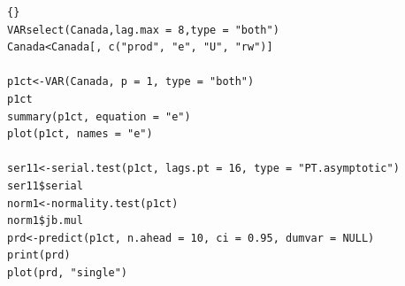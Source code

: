 %	
%			
%			
%	
\pagebreak
{}
\begin{lstlisting}[title={‘Código R: ejemplo Modelo VAR Mercado laboral canadiense},basicstyle=\ttfamily]{}
VARselect(Canada,lag.max = 8,type = "both")
Canada<Canada[, c("prod", "e", "U", "rw")]

p1ct<-VAR(Canada, p = 1, type = "both")
p1ct
summary(p1ct, equation = "e")
plot(p1ct, names = "e")

ser11<-serial.test(p1ct, lags.pt = 16, type = "PT.asymptotic")
ser11$serial
norm1<-normality.test(p1ct)
norm1$jb.mul
prd<-predict(p1ct, n.ahead = 10, ci = 0.95, dumvar = NULL)
print(prd)
plot(prd, "single")

\end{lstlisting}

	

